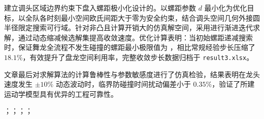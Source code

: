 \indent {} 建立调头区域边界约束下盘入螺距极小化设计的。以螺距参数 $d$ 最小化为优化目标，以全队各时刻最小空间欧氏间距大于零为安全约束，结合调头空间几何外接圆半径限定搜索可行域。针对非凸且计算开销大的仿真解空间，采用进行渐进迭代求解，通过动态缩减候选解集提高收敛速度。优化计算表明：当初始螺距递减搜索时，保证舞龙全流程不发生碰撞的螺距最小极限值为 ，相比常规经验步长压缩了 $18.1\%$，有效提升了盘龙空间利用率，完整收敛步长数据归档于 \texttt{result3.xlsx}。

\indent 文章最后对求解算法的计算鲁棒性与参数敏感度进行了仿真检验，结果表明在龙头速度发生 $\pm 10\%$ 动态波动时，临界防碰撞时间扰动偏差小于 $0.35\%$，验证了所建运动学模型具有优异的工程可靠性。

\vspace{0.4cm}

 ；；；；\label{abstract:end}

\newpage
